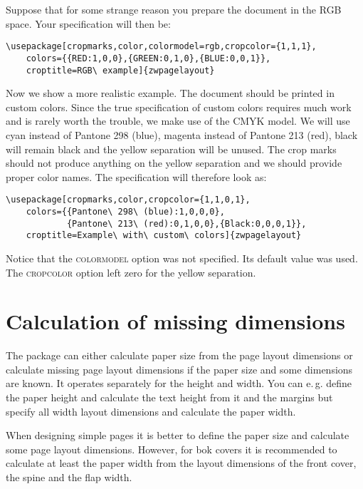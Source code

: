 \documentclass[11pt]{article}
\makeatletter
\def\opt#1{\texorpdfstring{\textmd{\textsc{#1}}}{#1}}
\def\eg.{e.\,g.\@}
\let\zwcomma\,
\def\,{\texorpdfstring{\zwcomma}{}}
\makeatother
\begin{document}
Suppose that for some strange reason you prepare the document in the RGB space. Your specification
will then be:

\medskip

\begin{verbatim}
\usepackage[cropmarks,color,colormodel=rgb,cropcolor={1,1,1},
    colors={{RED:1,0,0},{GREEN:0,1,0},{BLUE:0,0,1}},
    croptitle=RGB\ example]{zwpagelayout}
\end{verbatim}

\medskip

Now we show a more realistic example. The document should be printed in custom colors. Since the
true specification of custom colors requires much work and is rarely worth the trouble, we make use
of the CMYK model. We will use cyan instead of Pantone 298 (blue), magenta instead of Pantone 213
(red), black will remain black and the yellow separation will be unused. The crop marks should not
produce anything on the yellow separation and we should provide proper color names. The
specification will therefore look as:

\medskip

\begin{verbatim}
\usepackage[cropmarks,color,cropcolor={1,1,0,1},
    colors={{Pantone\ 298\ (blue):1,0,0,0},
            {Pantone\ 213\ (red):0,1,0,0},{Black:0,0,0,1}},
    croptitle=Example\ with\ custom\ colors]{zwpagelayout}
\end{verbatim}

\medskip

Notice that the \opt{colormodel} option was not specified. Its default value was used. The
\opt{cropcolor} option left zero for the yellow separation.

\section{Calculation of missing dimensions}\label{missing}
The package can either calculate paper size from the page layout dimensions or calculate missing
page layout dimensions if the paper size and some dimensions are known. It operates separately for
the height and width. You can \eg. define the paper height and calculate the text height from it
and the margins but specify all width layout dimensions and calculate the paper width.

When designing simple pages it is better to define the paper size and calculate some page layout
dimensions. However, for bok covers it is recommended to calculate at least the paper width from
the layout dimensions of the front cover, the spine and the flap width.
\end{document}

